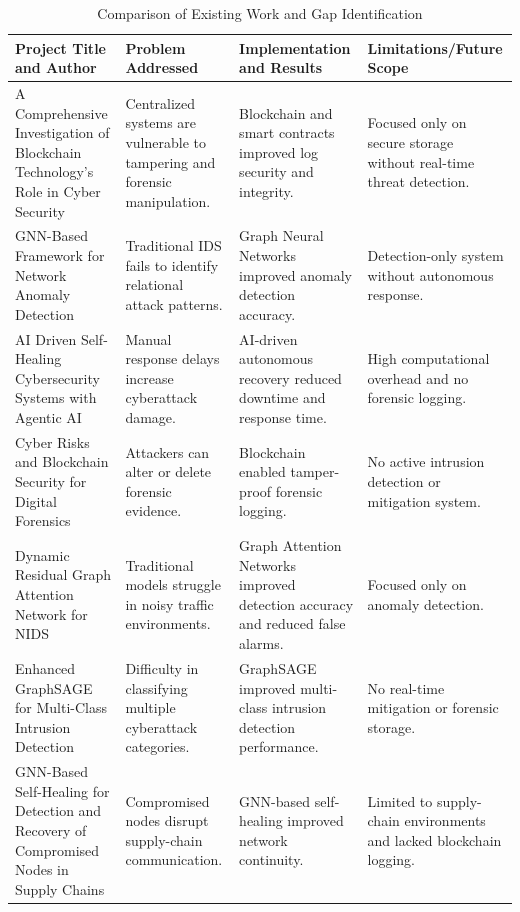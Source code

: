\documentclass[12pt,a4paper]{report}
\begin{document}
\begin{table}[htbp]
\caption{Comparison of Existing Work and Gap Identification}
\label{tab:comparison}
\centering
\footnotesize
\renewcommand{\arraystretch}{1.0}

\begin{tabular}{|m{3.4cm}|m{3.4cm}|m{3.4cm}|m{3.4cm}|}
\hline
\textbf{Project Title and Author} &
\textbf{Problem Addressed} &
\textbf{Implementation and Results} &
\textbf{Limitations/Future Scope}
\\
\hline

A Comprehensive Investigation of Blockchain Technology's Role in Cyber Security
&
Centralized systems are vulnerable to tampering and forensic manipulation.
&
Blockchain and smart contracts improved log security and integrity.
&
Focused only on secure storage without real-time threat detection.
\\
\hline

GNN-Based Framework for Network Anomaly Detection
&
Traditional IDS fails to identify relational attack patterns.
&
Graph Neural Networks improved anomaly detection accuracy.
&
Detection-only system without autonomous response.
\\
\hline

AI Driven Self-Healing Cybersecurity Systems with Agentic AI
&
Manual response delays increase cyberattack damage.
&
AI-driven autonomous recovery reduced downtime and response time.
&
High computational overhead and no forensic logging.
\\
\hline

Cyber Risks and Blockchain Security for Digital Forensics
&
Attackers can alter or delete forensic evidence.
&
Blockchain enabled tamper-proof forensic logging.
&
No active intrusion detection or mitigation system.
\\
\hline

Dynamic Residual Graph Attention Network for NIDS
&
Traditional models struggle in noisy traffic environments.
&
Graph Attention Networks improved detection accuracy and reduced false alarms.
&
Focused only on anomaly detection.
\\
\hline

Enhanced GraphSAGE for Multi-Class Intrusion Detection
&
Difficulty in classifying multiple cyberattack categories.
&
GraphSAGE improved multi-class intrusion detection performance.
&
No real-time mitigation or forensic storage.
\\
\hline

GNN-Based Self-Healing for Detection and Recovery of Compromised Nodes in Supply Chains
&
Compromised nodes disrupt supply-chain communication.
&
GNN-based self-healing improved network continuity.
&
Limited to supply-chain environments and lacked blockchain logging.
\\
\hline


\end{tabular}
\end{table}
\end{document}
